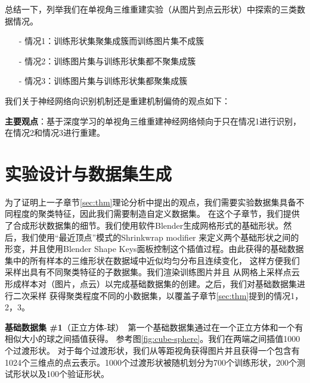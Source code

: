 \documentclass[bachelor, nocolorlinks, printoneside]{seuthesis} %
\begin{document}
\begin{Main}
总结一下，列举我们在单视角三维重建实验（从图片到点云形状）中探索的三类数据情况。
\label{sec:case}
\begin{itemize}
    \item[-] 情况1\label{sec:case1}：训练形状集聚集成簇而训练图片集不成簇
    \item[-] 情况2\label{sec:case2}：训练图片集与训练形状集都不聚集成簇
    \item[-] 情况3\label{sec:case3}：训练图片集与训练形状集都聚集成簇
\end{itemize}

我们关于神经网络向识别机制还是重建机制偏倚的观点如下：

\textbf{主要观点}：基于深度学习的单视角三维重建神经网络倾向于只在情况1进行识别，在情况2和情况3进行重建。


\section{实验设计与数据集生成}\label{sec:dataset}

为了证明上一子章节\ref{sec:thm}理论分析中提出的观点，我们需要实验数据集具备不同程度的聚类特征，因此我们需要制造自定义数据集。
在这个子章节，我们提供了合成形状数据集的细节。我们使用软件Blender生成网格形式的基础形状。然后，我们使用“最近顶点”模式的Shrinkwrap
modifier 来定义两个基础形状之间的形变，并且使用Blender Shape Keys面板控制这个插值过程。由此获得的基础数据集中的所有样本的三维形状在数据域中近似均匀分布且连续变化，
这样方便我们采样出具有不同聚类特征的子数据集。我们渲染训练图片并且
从网格上采样点云形成样本对（图片，点云）以完成基础数据集的创建。之后，我们对基础数据集进行二次采样
获得聚类程度不同的小数据集，以覆盖子章节\ref{sec:thm}提到的情况1，2，3。

\textbf{基础数据集 \#1}（正立方体-球）~第一个基础数据集通过在一个正立方体和一个有相似大小的球之间插值获得。
参考图\ref{fig:cube-sphere}。我们在两端之间插值1000个过渡形状。 对于每个过渡形状，我们从等距视角获得图片并且获得一个包含有
1024个三维点的点云表示。1000个过渡形状被随机划分为700个训练形状，200个测试形状以及100个验证形状。



\end{Main}
\end{document}
